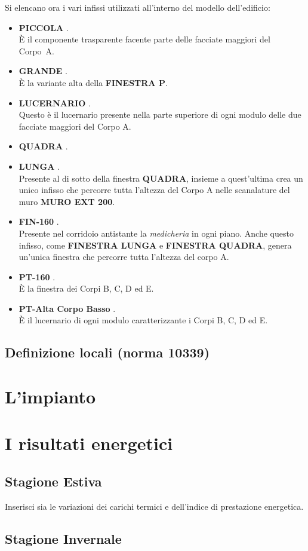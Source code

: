 Si elencano ora i vari infissi utilizzati all'interno del modello dell'edificio:
\begin{itemize}
	\item \textbf{PICCOLA} .\\ È il componente trasparente facente parte delle facciate maggiori del Corpo~A. 
	\item \textbf{GRANDE} .\\ È la variante alta della \textbf{FINESTRA P}. 
	\item \textbf{LUCERNARIO} .\\ Questo è il lucernario presente nella parte superiore di ogni modulo delle due facciate maggiori del Corpo A. 
	\item \textbf{QUADRA} .
	\item \textbf{LUNGA} .\\ Presente al di sotto della finestra \textbf{QUADRA}, insieme a quest'ultima crea un unico infisso che percorre tutta l'altezza del Corpo A nelle scanalature del muro \textbf{MURO EXT 200}. 
	\item \textbf{FIN-160} . \\ Presente nel corridoio antistante la \emph{medicheria} in ogni piano. Anche questo infisso, come \textbf{FINESTRA LUNGA} e \textbf{FINESTRA QUADRA}, genera un'unica finestra che percorre tutta l'altezza del corpo A.
	\item \textbf{PT-160} . \\ È la finestra dei Corpi B, C, D ed E. 
	\item \textbf{PT-Alta Corpo Basso} .\\ È il lucernario di ogni modulo caratterizzante i Corpi B, C, D ed E. 
\end{itemize}

\subsection{Definizione locali (norma 10339)}
\section{L'impianto}
\section{I risultati energetici}
\subsection{Stagione Estiva}
Inserisci sia le variazioni dei carichi termici e dell'indice di prestazione energetica.
\subsection{Stagione Invernale}

